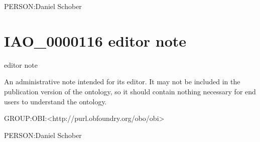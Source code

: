 \documentclass[letterpaper,10pt,english]{sphinxmanual}
\begin{document}
\begin{sphinxShadowBox}

\sphinxAtStartPar
PERSON:Daniel Schober
\end{sphinxShadowBox}
\begin{quote}
\label{\detokenize{doc-IAO_0000116:iao-0000116}}\label{\detokenize{doc-IAO_0000116:editor-note}}\label{\detokenize{doc-IAO_0000116:iao-0000116}}
\ignorespaces \end{quote}


\section{IAO\_0000116 \sphinxhyphen{} editor note}
\label{\detokenize{doc-IAO_0000116:iao-0000116-editor-note}}\label{\detokenize{doc-IAO_0000116:index-0}}\label{\detokenize{doc-IAO_0000116::doc}}
\begin{sphinxShadowBox}

\sphinxAtStartPar
editor note
\end{sphinxShadowBox}

\begin{sphinxShadowBox}

\sphinxAtStartPar
An administrative note intended for its editor. It may not be included in the publication version of the ontology, so it should contain nothing necessary for end users to understand the ontology.
\end{sphinxShadowBox}

\begin{sphinxShadowBox}

\sphinxAtStartPar
GROUP:OBI:\textless{}http://purl.obfoundry.org/obo/obi\textgreater{}
\end{sphinxShadowBox}

\begin{sphinxShadowBox}

\sphinxAtStartPar
PERSON:Daniel Schober
\end{sphinxShadowBox}
\begin{quote}
\label{\detokenize{doc-IAO_0000117:iao-0000117}}\label{\detokenize{doc-IAO_0000117:term-editor}}\label{\detokenize{doc-IAO_0000117:iao-0000117}}
\ignorespaces \end{quote}
\end{document}
